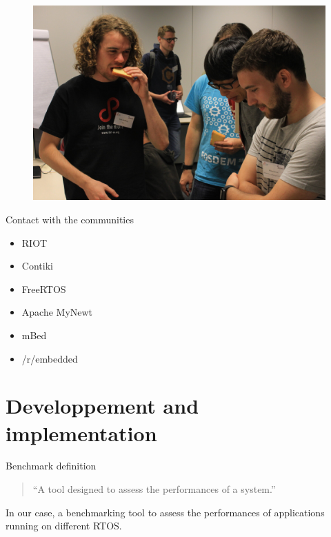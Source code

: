 \documentclass{beamer}
\begin{document}
\begin{frame}
  \begin{figure}
    \centering
    \includegraphics[scale=0.15]{assets/riotsummit.jpg}
    \end{figure}
\end{frame}


\begin{frame}{Contact with the communities}
\protect\hypertarget{contact-with-the-communities}{}

\begin{itemize}
\tightlist
\item RIOT
\item Contiki
\item FreeRTOS
\item Apache MyNewt
\item mBed
\item /r/embedded
\end{itemize}
\tightlist
\end{frame}


\hypertarget{developpement-and-implementation}{%
\section{Developpement and implementation}\label{developpement-and-implementation}}

\begin{frame}{Benchmark definition}
\protect\hypertarget{benchmark-definition}{}

\begin{quote}
``A tool designed to assess the performances of a system.''
\end{quote}

In our case, a benchmarking tool to assess the performances of
applications running on different RTOS.

\end{frame}
\end{document}
